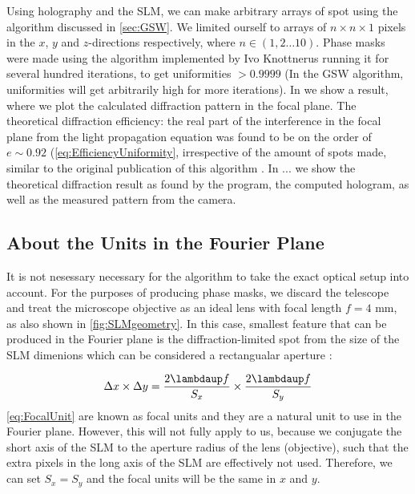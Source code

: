 Using holography and the SLM, we can make arbitrary arrays of spot using the algorithm discussed in \cref{sec:GSW}. 
We limited ourself to arrays of $n \times n \times 1$ pixels in the $x$, $y$ and $z$-directions respectively, where $n \in (1,2\ldots10)$. 
Phase masks were made using the algorithm implemented by Ivo Knottnerus running it for several hundred iterations, to get uniformities $>0.9999$ (In the \ac{GSW} algorithm, uniformities will get arbitrarily high for more iterations). 
In we show a result, where we plot the calculated diffraction pattern in the focal plane. The theoretical diffraction efficiency: the real part of the interference in the focal plane from the light propagation equation was found to be on the order of $e \sim 0.92$ (\cref{eq:EfficiencyUniformity}, irrespective of the amount of spots made, similar to the original publication of this algorithm \cite{DiLeonardo2007}.
In ... we show the theoretical diffraction result as found by the program, the computed hologram, as well as the measured pattern from the camera. 

\begin{mdframed}
    \subsection*{About the Units in the Fourier Plane}
    
    It is not nesessary necessary for the algorithm to take the exact optical setup into account.
    For the purposes of producing phase masks, we discard the telescope and treat the microscope objective as an ideal lens with focal length $f = 4$ mm, as also shown in \cref{fig:SLMgeometry}.
    In this case, smallest feature that can be produced in the Fourier plane is the diffraction-limited spot from the size of the SLM dimenions which can be considered a rectangualar aperture \cite{Bijnen2013,Bijnen2015}:
    
    \begin{equation}\label{eq:FocalUnit}
        \Delta x \times \Delta y = \frac{2\lambdaup f}{S_x} \times \frac{2 \lambdaup f}{S_y}
    \end{equation}
    \cref{eq:FocalUnit} are known as focal units and they are a natural unit to use in the Fourier plane.
    However, this will not fully apply to us, because we conjugate the short axis of the SLM to the aperture radius of the lens (objective), such that the extra pixels in the long axis of the SLM are effectively not used. 
    Therefore, we can set $S_x = S_y$ and the focal units will be the same in $x$ and $y$.
\end{mdframed}
    



